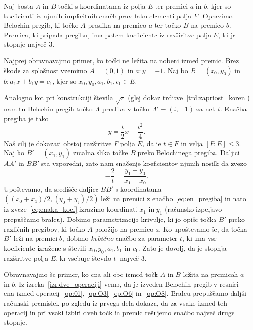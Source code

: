 \begin{lema}
    \label{lema:O7_razširitev}
    Naj bosta $A$ in $B$ točki s koordinatama iz polja $E$ ter premici $a$ in $b$, kjer so koeficienti iz njunih implicitnih enačb prav tako elementi polja $E$. Opravimo Belochin pregib, ki točko $A$ preslika na premico $a$ ter točko $B$ na premico $b$. Premica, ki pripada pregibu, ima potem koeficiente iz razširitve polja $E$, ki je stopnje največ $3$.
\end{lema}
\begin{dokaz}
    Najprej obravnavajmo primer, ko točki ne ležita na nobeni izmed premic. Brez škode za splošnost vzemimo $A = (0,1)$ in $a : y = -1$. Naj bo $B = (x_0, y_0)$ in $b : a_1 x + b_1 y = c_1$, kjer so $x_0, y_0, a_1, b_1, c_1 \in E$.

    Analogno kot pri konstrukciji števila $\sqrt{r}$ (glej dokaz trditve~\ref{trd:zaprtost_koren}) nam tu Belochin pregib točko $A$ preslika v točko $A' = (t, -1)$ za nek $t$. Enačba pregiba je tako
    \begin{equation}
        \label{eq:en_pregiba}
        y = \frac{t}{2}x - \frac{t^2}{4}.
    \end{equation}
    Naš cilj je dokazati obstoj razširitve $F$ polja $E$, da je $t \in F$ in velja $[F:E] \leq 3$. Naj bo $B' = (x_1, y_1)$ zrcalna slika točke $B$ preko Belochinega pregiba. Daljici $AA'$ in $BB'$ sta vzporedni, zato nam enačenje koeficientov njunih nosilk da zvezo
    \begin{equation}
        \label{eq:enaka_koef}
        -\frac{2}{t} = \frac{y_1 - y_0}{x_1 - x_0}.
    \end{equation}
    Upoštevamo, da središče daljice $BB'$ s koordinatama $((x_0 + x_1)/2, (y_0 + y_1)/2)$ leži na premici z enačbo~\eqref{eq:en_pregiba} in nato iz zveze~\eqref{eq:enaka_koef} izrazimo koordinati $x_1$ in $y_1$ (računsko izpeljavo prepuščamo bralcu). Dobimo parametrizacijo krivulje, ki jo opiše točka $B'$ preko različnih pregibov, ki točko $A$ položijo na premico $a$. Ko upoštevamo še, da točka $B'$ leži na premici $b$, dobimo \emph{kubično} enačbo za parameter $t$, ki ima vse koeficiente izražene s števili $x_0, y_0, a_1, b_1$ in $c_1$. Zato je dovolj, da je stopnja razširitve polja $E$, ki vsebuje število $t$, največ $3$.

    Obravnavajmo še primer, ko ena ali obe izmed točk $A$ in $B$ ležita na premicah $a$ in $b$. Iz izreka~\ref{izr:dve_operaciji} vemo, da je izveden Belochin pregib v resnici ena izmed operacij~\ref{op:01}, \ref{op:O3}--\ref{op:O6} in~\ref{op:O8}. Bralcu prepuščamo daljši računski premislek po zgledu iz prvega dela dokaza, da za vsako izmed teh operacij in pri vsaki izbiri dveh točk in premic rešujemo enačbo največ druge stopnje.
\end{dokaz}

